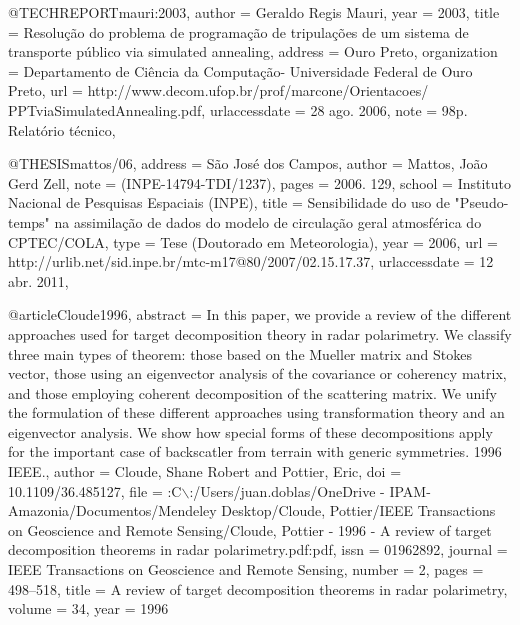 @TECHREPORT{mauri:2003,
   author = {Geraldo Regis Mauri}, 
   year = {2003},
   title = {Resolu{\c{c}}{\~a}o do problema de programa{\c{c}}{\~a}o 
   de tripula{\c{c}}{\~o}es de um sistema de transporte p{\'u}blico via 
   simulated annealing},
   address = {Ouro Preto},
   organization = {Departamento de Ci{\^e}ncia da Computa{\c{c}}{\~a}o{-} 
   Universidade Federal de Ouro Preto},
   url = {http://www.decom.ufop.br/prof/marcone/Orientacoes/
   PPTviaSimulatedAnnealing.pdf},
   urlaccessdate  = {28 ago. 2006},   
   note = { 98p. Relat{\'orio t{\'e}cnico}},
}

@THESIS{mattos/06,
 address = {S{\~a}o Jos{\'e} dos Campos},
 author = {Mattos, Jo{\~a}o Gerd Zell},
 note = {(INPE-14794-TDI/1237)},
 pages = {2006. 129},
 school = {Instituto Nacional de Pesquisas Espaciais (INPE)},
 title = {Sensibilidade do uso de "Pseudo-temps" na  assimila{\c{c}}{\~a}o de dados do modelo de 
 circula{\c{c}}{\~a}o geral atmosf{\'e}rica do CPTEC/COLA},
 type = {Tese (Doutorado em Meteorologia)},
 year = {2006},              
 url = {http://urlib.net/sid.inpe.br/mtc-m17@80/2007/02.15.17.37},
 urlaccessdate = {12 abr. 2011},
}


@article{Cloude1996,
abstract = {In this paper, we provide a review of the different approaches used for target decomposition theory in radar polarimetry. We classify three main types of theorem: those based on the Mueller matrix and Stokes vector, those using an eigenvector analysis of the covariance or coherency matrix, and those employing coherent decomposition of the scattering matrix. We unify the formulation of these different approaches using transformation theory and an eigenvector analysis. We show how special forms of these decompositions apply for the important case of backscatler from terrain with generic symmetries. {\textcopyright} 1996 IEEE.},
author = {Cloude, Shane Robert and Pottier, Eric},
doi = {10.1109/36.485127},
file = {:C$\backslash$:/Users/juan.doblas/OneDrive - IPAM-Amazonia/Documentos/Mendeley Desktop/Cloude, Pottier/IEEE Transactions on Geoscience and Remote Sensing/Cloude, Pottier - 1996 - A review of target decomposition theorems in radar polarimetry.pdf:pdf},
issn = {01962892},
journal = {IEEE Transactions on Geoscience and Remote Sensing},
number = {2},
pages = {498--518},
title = {{A review of target decomposition theorems in radar polarimetry}},
volume = {34},
year = {1996}
}


